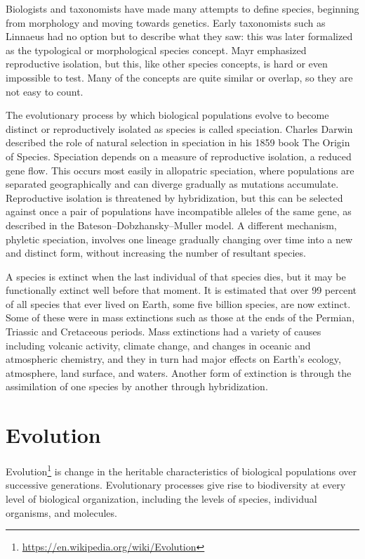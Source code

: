 \documentclass[]{book}
\let\rmarkdownfootnote\footnote%
\def\footnote{\protect\rmarkdownfootnote}
\renewcommand{\href}[2]{#2\footnote{\url{#1}}}
\theoremstyle{definition}
\theoremstyle{definition}
\theoremstyle{definition}
\theoremstyle{remark}
\begin{document}
Biologists and taxonomists have made many attempts to define species,
beginning from morphology and moving towards genetics. Early taxonomists
such as Linnaeus had no option but to describe what they saw: this was
later formalized as the typological or morphological species concept.
Mayr emphasized reproductive isolation, but this, like other species
concepts, is hard or even impossible to test. Many of the concepts are
quite similar or overlap, so they are not easy to count.

The evolutionary process by which biological populations evolve to
become distinct or reproductively isolated as species is called
speciation. Charles Darwin described the role of natural selection in
speciation in his 1859 book The Origin of Species. Speciation depends on
a measure of reproductive isolation, a reduced gene flow. This occurs
most easily in allopatric speciation, where populations are separated
geographically and can diverge gradually as mutations accumulate.
Reproductive isolation is threatened by hybridization, but this can be
selected against once a pair of populations have incompatible alleles of
the same gene, as described in the Bateson--Dobzhansky--Muller model. A
different mechanism, phyletic speciation, involves one lineage gradually
changing over time into a new and distinct form, without increasing the
number of resultant species.

A species is extinct when the last individual of that species dies, but
it may be functionally extinct well before that moment. It is estimated
that over 99 percent of all species that ever lived on Earth, some five
billion species, are now extinct. Some of these were in mass extinctions
such as those at the ends of the Permian, Triassic and Cretaceous
periods. Mass extinctions had a variety of causes including volcanic
activity, climate change, and changes in oceanic and atmospheric
chemistry, and they in turn had major effects on Earth's ecology,
atmosphere, land surface, and waters. Another form of extinction is
through the assimilation of one species by another through
hybridization. 

\section{Evolution}\label{evolution}

\href{https://en.wikipedia.org/wiki/Evolution}{Evolution} is change in
the heritable characteristics of biological populations over successive
generations. Evolutionary processes give rise to biodiversity at every
level of biological organization, including the levels of species,
individual organisms, and molecules.
\end{document}
